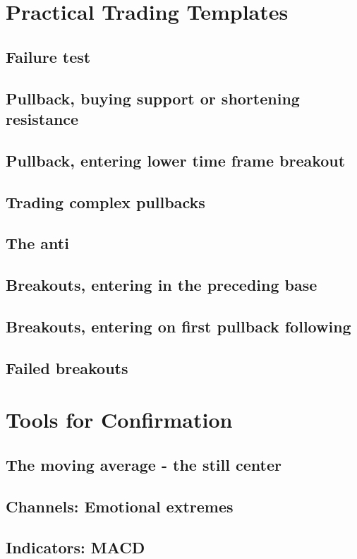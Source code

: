 \documentclass[10pt,twocolumn]{article}
\begin{document}
\section{Practical Trading Templates}
\subsection{Failure test}
\subsection{Pullback, buying support or shortening resistance}
\subsection{Pullback, entering lower time frame breakout}
\subsection{Trading complex pullbacks}
\subsection{The anti}
\subsection{Breakouts, entering in the preceding base}
\subsection{Breakouts, entering on first pullback following}
\subsection{Failed breakouts}

\section{Tools for Confirmation}
\subsection{The moving average - the still center}
\subsection{Channels: Emotional extremes}
\subsection{Indicators: MACD}
\end{document}
